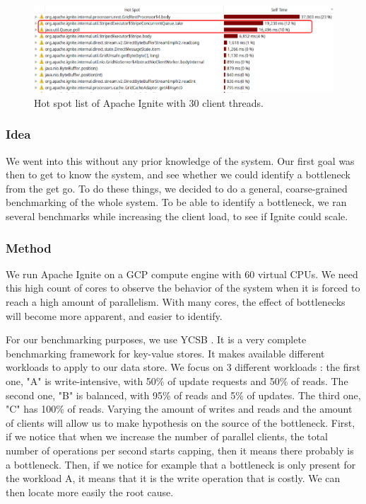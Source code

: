 \documentclass[conference]{IEEEtran}
\begin{document}
\begin{figure}[!ht]
\includegraphics[width=\textwidth]{hotspot.png}
\caption{Hot spot list of Apache Ignite with 30 client threads.}
\label{hotspot}
\end{figure}

\subsubsection{Idea}
We went into this without any prior knowledge of the system. Our first goal was then to get to know the system, and see whether we could identify a bottleneck from the get go. To do these things, we decided to do a general, coarse-grained benchmarking of the whole system. To be able to identify a bottleneck, we ran several benchmarks while increasing the client load, to see if Ignite could scale.
\subsubsection{Method}
We run Apache Ignite on a GCP compute engine with 60 virtual CPUs. We need this high count of cores to observe the behavior of the system when it is forced to reach a high amount of parallelism. With many cores, the effect of bottlenecks will become more apparent, and easier to identify.

For our benchmarking purposes, we use YCSB \cite{YCSB}. It is a very complete benchmarking framework for key-value stores. It makes available different workloads to apply to our data store. We focus on 3 different workloads : the first one, "A" is write-intensive, with 50\% of update requests and 50\% of reads. The second one, "B" is balanced, with 95\% of reads and 5\% of updates. The third one, "C" has 100\% of reads.
Varying the amount of writes and reads and the amount of clients will allow us to make hypothesis on the source of the bottleneck. 
First, if we notice that when we increase the number of parallel clients, the total number of operations per second starts capping, then it means there probably is a bottleneck. Then, if we notice for example that a bottleneck is only present for the workload A, it means that it is the write operation that is costly. We can then locate more easily the root cause.
\end{document}
